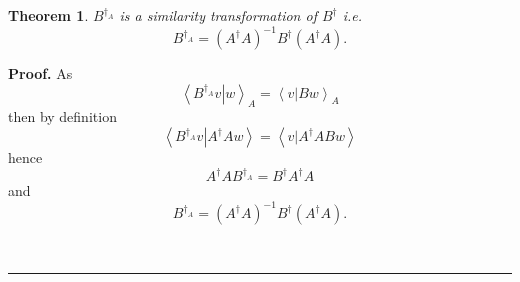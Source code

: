 \documentclass[aps,preprint]{revtex4}%
\newtheorem{theorem}{Theorem}
\newenvironment{proof}[1][Proof]{\noindent\textbf{#1.} }{\ \rule{0.5em}{0.5em}}
\begin{document}
\begin{theorem}
$B^{\dagger_{A}}$ is a similarity transformation of $B^{\dagger}$ i.e.
\begin{equation}
B^{\dagger_{A}}=\left(  A^{\dagger}A\right)  ^{-1}B^{\dagger}\left(
A^{\dagger}A\right)  .
\end{equation}

\end{theorem}

\begin{proof}
As%
\begin{equation}
\left\langle \left.  B^{\dagger_{A}}v\right\vert w\right\rangle _{A}%
=\left\langle \left.  v\right\vert Bw\right\rangle _{A}%
\end{equation}
then by definition
\begin{equation}
\left\langle \left.  B^{\dagger_{A}}v\right\vert A^{\dagger}Aw\right\rangle
=\left\langle \left.  v\right\vert A^{\dagger}ABw\right\rangle
\end{equation}
hence
\begin{equation}
A^{\dagger}AB^{\dagger_{A}}=B^{\dagger}A^{\dagger}A
\end{equation}
and
\begin{equation}
B^{\dagger_{A}}=\left(  A^{\dagger}A\right)  ^{-1}B^{\dagger}\left(
A^{\dagger}A\right)  .
\end{equation}

\end{proof}
\end{document}
